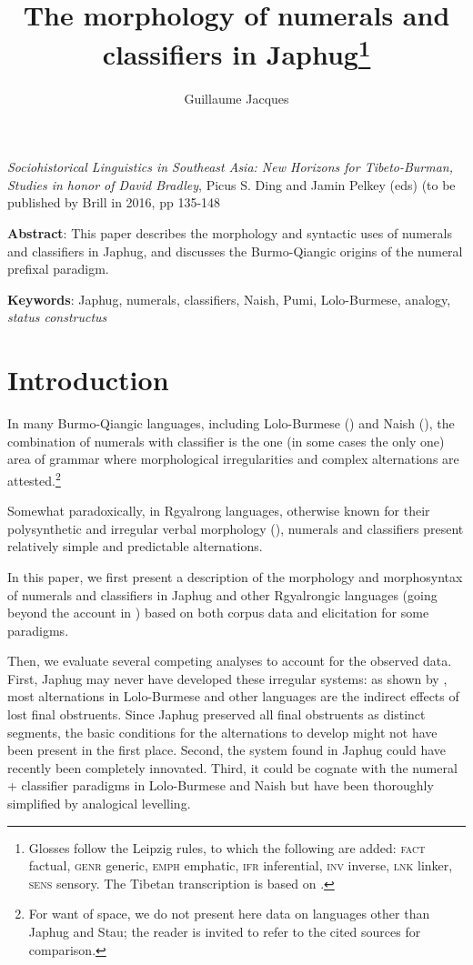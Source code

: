 \documentclass[oldfontcommands,oneside,a4paper,12pt]{article}
\begin{document}
\title{The morphology of numerals and classifiers  in Japhug\footnote{Glosses follow the Leipzig rules, to which the following are added:  \textsc{fact} factual, \textsc{genr} generic,   \textsc{emph} emphatic, \textsc{ifr} inferential, \textsc{inv} inverse, \textsc{lnk} linker, \textsc{sens} sensory. The Tibetan transcription is based on \citet{jacques12transcription}.} }
\author{Guillaume Jacques}
\maketitle

\sloppy
\textit{Sociohistorical Linguistics in Southeast Asia: New Horizons for Tibeto-Burman, Studies in honor of David Bradley}, Picus S. Ding and Jamin Pelkey (eds) (to be published by Brill in 2016, pp 135-148

\textbf{Abstract}: This paper describes the morphology and syntactic uses of numerals and classifiers in Japhug, and discusses the Burmo-Qiangic origins of the numeral prefixal paradigm.

\textbf{Keywords}: Japhug, numerals, classifiers, Naish, Pumi, Lolo-Burmese, analogy, \textit{status constructus}



\section{Introduction}
In many Burmo-Qiangic languages, including Lolo-Burmese (\citealt{bradley05numerals}) and Naish (\citealt{michaud11cl, michaud13numeral}), the combination of numerals with classifier is the one (in some cases the only one) area of grammar where morphological irregularities and complex alternations are attested.\footnote{For want of space, we do not present here data on languages other than Japhug and Stau; the reader is invited to refer to the cited sources for comparison.}

Somewhat paradoxically, in Rgyalrong languages, otherwise known for their polysynthetic and irregular verbal morphology (\citealt{jackson14morpho, jacques12incorp}), numerals and classifiers present relatively simple and predictable alternations. 

In this paper, we first present a  description of the morphology and morphosyntax of numerals and classifiers in Japhug and other Rgyalrongic  languages (going beyond the account in   \citealt{jacques08}) based on both corpus data and elicitation for some paradigms. 

Then, we evaluate several competing analyses to account for the observed data. First,   Japhug may never have developed these irregular systems: as shown by \citet{bradley05numerals}, most alternations in Lolo-Burmese and other languages  are the indirect effects of lost final obstruents. Since Japhug preserved all final obstruents as distinct segments, the basic conditions for the alternations to develop might not have been present in the first place. Second, the system found in Japhug could have recently been completely innovated. Third,  it could be cognate with the numeral + classifier paradigms in Lolo-Burmese and Naish but have been thoroughly simplified by analogical levelling.   
\end{document}
